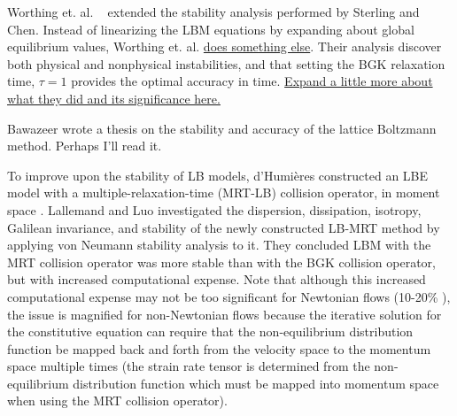 \documentclass{article}
\begin{document}
Worthing et. al. ~\cite{worthing1997stability} extended the stability analysis performed by Sterling and Chen.
Instead of linearizing the LBM equations by expanding about global equilibrium values, Worthing et. al. \ul{does something else}.
Their analysis discover both physical and nonphysical instabilities, and that setting the BGK relaxation time, $\tau = 1$ provides the optimal accuracy in time. %
\ul{Expand a little more about what they did and its significance here.}

{\color{red} Bawazeer wrote a thesis on the stability and accuracy of the lattice Boltzmann method. Perhaps I'll read it.}

To improve upon the stability of LB models, d'Humi\`{e}res constructed an LBE model with a multiple-relaxation-time (MRT-LB) collision operator, in moment space \cite{d1994generalized}. %
Lallemand and Luo investigated the dispersion, dissipation, isotropy, Galilean invariance, and stability of the newly constructed LB-MRT method by applying von Neumann stability analysis to it\cite{lallemand2000theory}.
They concluded LBM with the MRT collision operator was more stable than with the BGK collision operator, but with increased computational expense. %
Note that although this increased computational expense may not be too significant for Newtonian flows (10-20\% \cite{lallemand2000theory}), the issue is magnified for non-Newtonian flows because the iterative solution for the constitutive equation can require that the non-equilibrium distribution function be mapped back and forth from the velocity space to the momentum space multiple times (the strain rate tensor is determined from the non-equilibrium distribution function which must be mapped into momentum space when using the MRT collision operator). %
\end{document}
